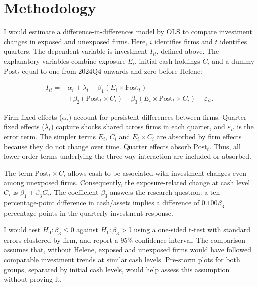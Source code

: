 \section*{Methodology}

I would estimate a difference-in-differences model by OLS to compare investment changes in exposed and unexposed firms. Here, $i$ identifies firms and $t$ identifies quarters. The dependent variable is investment $I_{it}$, defined above. The explanatory variables combine exposure $E_i$, initial cash holdings $C_i$ and a dummy $\mathrm{Post}_t$ equal to one from 2024Q4 onwards and zero before Helene:

\begin{equation*}
\begin{aligned}
I_{it} ={}& \alpha_i + \lambda_t + \beta_1(E_i \times \mathrm{Post}_t) \\
&+ \beta_2(\mathrm{Post}_t \times C_i)
 + \beta_3(E_i \times \mathrm{Post}_t \times C_i) + \varepsilon_{it}.
\end{aligned}
\end{equation*}

Firm fixed effects ($\alpha_i$) account for persistent differences between firms. Quarter fixed effects ($\lambda_t$) capture shocks shared across firms in each quarter, and $\varepsilon_{it}$ is the error term. The simpler terms $E_i$, $C_i$ and $E_i \times C_i$ are absorbed by firm effects because they do not change over time. Quarter effects absorb $\mathrm{Post}_t$. Thus, all lower-order terms underlying the three-way interaction are included or absorbed.

The term $\mathrm{Post}_t \times C_i$ allows cash to be associated with investment changes even among unexposed firms. Consequently, the exposure-related change at cash level $C_i$ is $\beta_1 + \beta_3 C_i$. The coefficient $\beta_3$ answers the research question: a ten-percentage-point difference in cash/assets implies a difference of $0.100\beta_3$ percentage points in the quarterly investment response.

I would test $H_0: \beta_3 \leq 0$ against $H_1: \beta_3 > 0$ using a one-sided t-test with standard errors clustered by firm, and report a 95\% confidence interval. The comparison assumes that, without Helene, exposed and unexposed firms would have followed comparable investment trends at similar cash levels. Pre-storm plots for both groups, separated by initial cash levels, would help assess this assumption without proving it.
